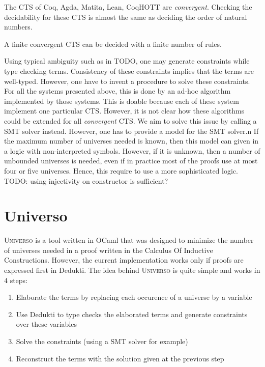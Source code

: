 \documentclass[conference]{IEEEtran}
\newcommand{\universo}{\textsc{Universo}}
\begin{document}
\begin{example}
  The CTS of Coq, Agda, Matita, Lean, CoqHOTT are \textit{convergent}. Checking the decidability for these CTS is almost the same as deciding the order of natural numbers.
\end{example}

\begin{theorem}
  A finite convergent CTS can be decided with a finite number of rules.
\end{theorem}

Using typical ambiguity such as in TODO, one may generate constraints while type checking terms. Consistency of these constraints implies that the terms are well-typed. However, one have to invent a procedure to solve these constraints. For all the systems presented above, this is done by an ad-hoc algorithm implemented by those systems. This is doable because each of these system implement one particular CTS. However, it is not clear how these algorithms could be extended for all \textit{convergent} CTS. We aim to solve this issue by calling a SMT solver instead. However, one has to provide a model for the SMT solver.n  If the maximum number of universes needed is known, then this model can given in a logic with non-interpreted symbols. However, if it is unknown, then a number of unbounded universes is needed, even if in practice most of the proofs use at most four or five universes. Hence, this require to use a more sophisticated logic. TODO: using injectivity on constructor is sufficient?


%



\section{Universo}

\universo{} is a tool written in OCaml that was designed to minimize the number of universes needed in a proof written in the Calculus Of Inductive Constructions. However, the current implementation works only if proofs are expressed first in Dedukti. The idea behind \universo{} is quite simple and works in \(4\) steps:
\begin{enumerate}
\item Elaborate the terms by replacing each occurence of a universe by a variable
\item Use Dedukti to type checks the elaborated terms and generate constraints over these variables
\item Solve the constraints (using a SMT solver for example)
\item Reconstruct the terms with the solution given at the previous step
\end{enumerate}
\end{document}
